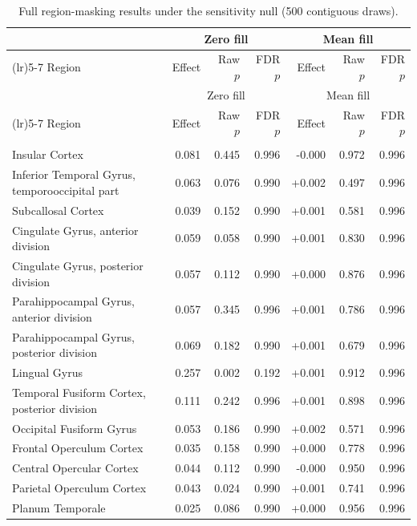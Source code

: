 \documentclass[11pt]{article}
\begin{document}
{\vspace{1em}
\begin{longtable}{>{\raggedright\arraybackslash}p{6.4cm}rrrrrr}
\caption{Full region-masking results under the sensitivity null (500 contiguous draws).}\label{tab:fullsen}\\
\toprule
& \multicolumn{3}{c}{Zero fill} & \multicolumn{3}{c}{Mean fill} \\
\cmidrule(lr){2-4}\cmidrule(lr){5-7}
Region & Effect & Raw $p$ & FDR $p$ & Effect & Raw $p$ & FDR $p$ \\
\midrule
\endfirsthead
\toprule
& \multicolumn{3}{c}{Zero fill} & \multicolumn{3}{c}{Mean fill} \\
\cmidrule(lr){2-4}\cmidrule(lr){5-7}
Region & Effect & Raw $p$ & FDR $p$ & Effect & Raw $p$ & FDR $p$ \\
\midrule
\endhead
\midrule
\multicolumn{7}{r}{\emph{continued on next page}}\\
\endfoot
\bottomrule
\endlastfoot
Insular Cortex & 0.081 & 0.445 & 0.996 & -0.000 & 0.972 & 0.996 \\
Inferior Temporal Gyrus, temporooccipital part & 0.063 & 0.076 & 0.990 & +0.002 & 0.497 & 0.996 \\
Subcallosal Cortex & 0.039 & 0.152 & 0.990 & +0.001 & 0.581 & 0.996 \\
Cingulate Gyrus, anterior division & 0.059 & 0.058 & 0.990 & +0.001 & 0.830 & 0.996 \\
Cingulate Gyrus, posterior division & 0.057 & 0.112 & 0.990 & +0.000 & 0.876 & 0.996 \\
Parahippocampal Gyrus, anterior division & 0.057 & 0.345 & 0.996 & +0.001 & 0.786 & 0.996 \\
Parahippocampal Gyrus, posterior division & 0.069 & 0.182 & 0.990 & +0.001 & 0.679 & 0.996 \\
Lingual Gyrus & 0.257 & 0.002 & 0.192 & +0.001 & 0.912 & 0.996 \\
Temporal Fusiform Cortex, posterior division & 0.111 & 0.242 & 0.996 & +0.001 & 0.898 & 0.996 \\
Occipital Fusiform Gyrus & 0.053 & 0.186 & 0.990 & +0.002 & 0.571 & 0.996 \\
Frontal Operculum Cortex & 0.035 & 0.158 & 0.990 & +0.000 & 0.778 & 0.996 \\
Central Opercular Cortex & 0.044 & 0.112 & 0.990 & -0.000 & 0.950 & 0.996 \\
Parietal Operculum Cortex & 0.043 & 0.024 & 0.990 & +0.001 & 0.741 & 0.996 \\
Planum Temporale & 0.025 & 0.086 & 0.990 & +0.000 & 0.956 & 0.996 \\

\end{longtable}}
\end{document}
